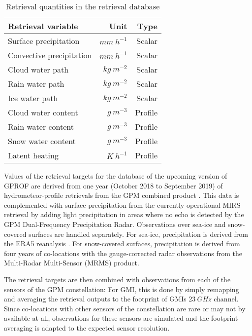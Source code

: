 \documentclass[a4paper,11pt,bibtotoc]{scrartcl}
\begin{document}
\begin{table}
  \caption{Retrieval quantities in the retrieval database}
  \label{tab:variables}
  \centering
  \begin{tabular}{l|rr}
    Retrieval variable & Unit & Type\\
    \hline
    Surface precipitation & $\unit{mm\ h^{-1}}$ & Scalar \\
    Convective precipitation & $\unit{mm\ h^{-1}}$ & Scalar \\
    Cloud water path & $\unit{kg\ m^{-2}}$ & Scalar \\
    Rain water path & $\unit{kg\ m^{-2}}$ & Scalar \\
    Ice water path & $\unit{kg\ m^{-2}}$ & Scalar \\
    Cloud water content & $\unit{g\ m^{-3}}$ & Profile \\
    Rain water content & $\unit{g\ m^{-3}}$ & Profile \\
    Snow water content & $\unit{g\ m^{-3}}$ & Profile \\
    Latent heating & $\unit{K \ h^{-1}}$ & Profile \\
  \end{tabular}
\end{table}

Values of the retrieval targets for the database of the upcoming version of
GPROF are derived from one year (October 2018 to September 2019) of
hydrometeor-profile retrievals from the GPM combined product \citep{grecu16}.
This data is complemented with surface precipitation from the currently
operational MIRS retrieval by adding light precipitation in areas where no echo
is detected by the GPM Dual-Frequency Precipitation Radar. Observations over
sea-ice and snow-covered surfaces are handled separately. For sea-ice,
precipitation is derived from the ERA5 reanalysis \citep{hersbach20}. For
snow-covered surfaces, precipitation is derived from four years of co-locations
with the gauge-corrected radar observations from the Multi-Radar Multi-Sensor
(MRMS) product.

The retrieval targets are then combined with observations from each of the
sensors of the GPM constellation: For GMI, this is done by simply remapping and
averaging the retrieval outputs to the footprint of GMIs $23\ \unit{GHz}$
channel. Since co-locations with other sensors of the constellation are rare or
may not by available at all, observations for these sensors are simulated and
the footprint averaging is adapted to the expected sensor resolution.
\end{document}
